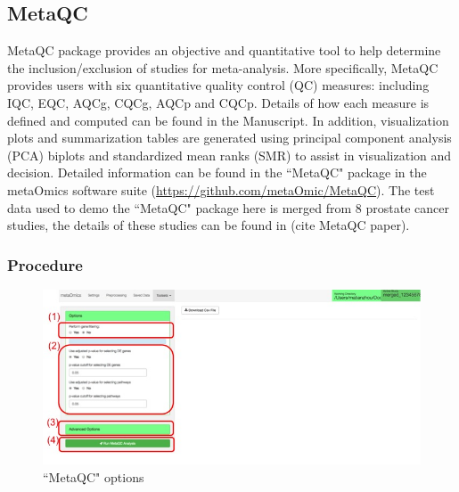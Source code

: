 \subsection{MetaQC}
MetaQC package provides an objective and quantitative tool to help determine the inclusion/exclusion of studies for meta-analysis. More specifically, MetaQC provides users with six quantitative quality control (QC) measures: including IQC, EQC, AQCg, CQCg, AQCp and CQCp. Details of how each measure is defined and computed can be found in the Manuscript. In addition, visualization plots and summarization tables are generated using principal component analysis (PCA) biplots and standardized mean ranks (SMR) to assist in visualization and decision. Detailed information can be found in the ``MetaQC" package in the metaOmics software suite (\url{https://github.com/metaOmic/MetaQC}). The test data used to demo the ``MetaQC" package here is merged from 8 prostate cancer studies, the details of these studies can be found in (cite MetaQC paper). 

\subsubsection{Procedure}

\begin{figure}[H]
\begin{center}
\includegraphics[scale=0.4]{./figure/metaQC/metaQCoption.jpg}
\caption{``MetaQC" options}
\label{fig:MetaQCoption}
\end{center}
\end{figure}

